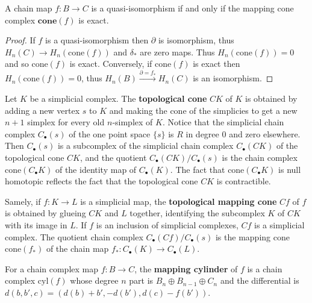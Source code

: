 \begin{cor} A chain map $f:B\rightarrow C$ is a quasi-isomorphism if and only if the mapping cone complex $\textbf{cone}(f)$ is exact.
\end{cor}
\begin{proof}
If $f$ is a quasi-isomorphism then $\partial$ is isomorphism, thus $H_n(C)\rightarrow H_n(\textrm{cone}(f))$ and $\delta_*$ are zero maps. Thus $H_n(\textrm{cone}(f))=0$ and so $\textrm{cone}(f)$ is exact. Conversely, if $\textrm{cone}(f)$ is exact then $H_n(\textrm{cone}(f))=0$, thus $H_n(B)\xrightarrow{\partial=f_*} H_n(C)$ is an isomorphism.
\end{proof}

\begin{defn} Let $K$ be a simplicial complex. The \textbf{topological cone} $CK$ of $K$ is obtained by adding a new vertex $s$ to $K$ and making the cone of the simplicies to get a new $n+1$ simplex for every old $n$-simplex of $K$. Notice that the simplicial chain complex $C_\bullet(s)$ of the one point space $\{s\}$ is $R$ in degree $0$ and zero elsewhere. Then $C_\bullet(s)$ is a subcomplex of the simplicial chain complex $C_\bullet(CK)$ of the topological cone $CK$, and the quotient $C_\bullet(CK)/C_\bullet(s)$ is the chain complex $\textrm{cone}(C_\bullet K)$ of the identity map of $C_\bullet(K)$. The fact that $\textrm{cone}(C_\bullet K)$ is null homotopic reflects the fact that the topological cone $CK$ is contractible.

Samely, if $f:K\rightarrow L$ is a simplicial map, the \textbf{topological mapping cone} $Cf$ of $f$ is obtained by glueing $CK$ and $L$ together, identifying the subcomplex $K$ of $CK$ with its image in $L$. If $f$ is an inclusion of simplicial complexes, $Cf$ is a simplicial complex. The quotient chain complex $C_\bullet(Cf)/C_\bullet(s)$ is the mapping cone $\textrm{cone}(f_*)$ of the chain map $f_*:C_\bullet(K)\rightarrow C_\bullet(L)$.
\end{defn}

\begin{defn} For a chain complex map $f:B\rightarrow C$, the \textbf{mapping cylinder} of $f$ is a chain complex $\textrm{cyl}(f)$ whose degree $n$ part is $B_n\oplus B_{n-1}\oplus C_n$ and the differential is $d(b,b',c)=(d(b)+b',-d(b'),d(c)-f(b'))$.
\end{defn}

